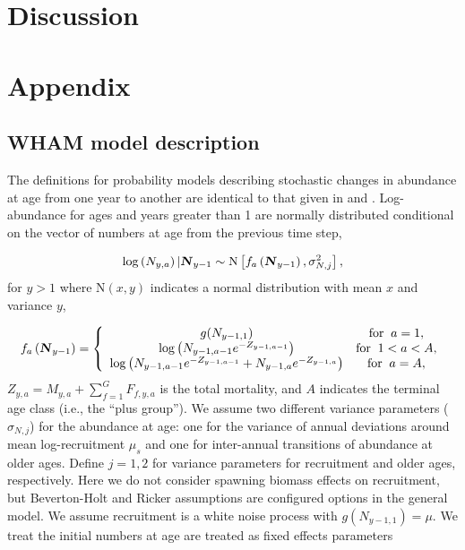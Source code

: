 \documentclass[12pt,letterpaper, leqno]{article}
\begin{document}
\section*{Discussion}

\clearpage





\clearpage

\section*{Appendix}

\subsection*{WHAM model description}

The definitions for probability models describing stochastic changes in abundance at age from one year to another are identical to that given in \citet{milleretal16} and \citet{millerhyun18}. Log-abundance for ages and years greater than 1 are normally distributed conditional on the vector of numbers at age from the previous
time step,

\vspace{-12pt}
\begin{equation*}
\log\left( N_{y,a}\right) | \textbf{\textsl{N}}_{y-1} \sim \text{N}\left[f_a\left(\textbf{\textsl{N}}_{y-1}\right), \sigma_{N,j}^2\right],
\end{equation*}
for $y>1$ where $\text{N}(x,y)$ indicates a normal distribution with mean $x$ and variance $y$,

\vspace{-12pt}
\begin{equation*}
 f_a\left(\textbf{\textsl{N}}_{y-1}\right) = \left\{ 
 \begin{array}{cc}
   g(N_{y-1,1}) & \text{for}\;\;a = 1,\\
   \log\left(N_{y-1,a-1}e^{-Z_{y-1,a-1}}\right) & \text{for}\;\;1<a<A,\\
   \log\left(N_{y-1,a-1}e^{-Z_{y-1,a-1}} + N_{y-1,a}e^{-Z_{y-1,a}}\right) & \text{for}\;\;a = A,
 \end{array}\right.
\end{equation*}
$Z_{y,a} = M_{y,a}+ \sum^G_{f=1} F_{f,y,a}$ is the total mortality, and $A$ indicates the terminal age class (i.e., the ``plus group''). We assume two different variance parameters ($\sigma_{N,j}$) for the abundance at age: one for the variance of annual deviations around mean log-recruitment $\mu_s$ and one for inter-annual transitions of abundance at older ages. Define $j = 1,2$ for variance parameters for recruitment and older ages, respectively. Here we do not consider spawning biomass effects on recruitment, but Beverton-Holt and Ricker assumptions are configured options in the general model. We assume recruitment is a white noise process with $g(N_{y-1,1}) = \mu$. We treat the initial numbers at age are treated as fixed effects parameters
\end{document}
